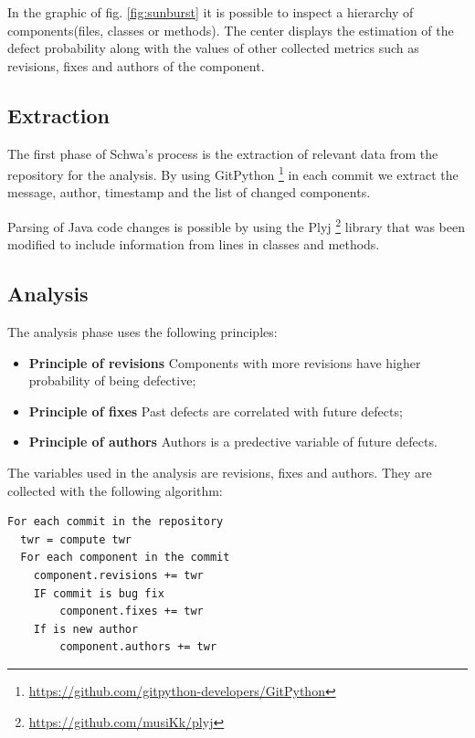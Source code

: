 \documentclass[9pt,a4paper]{extarticle}
\begin{document}
\begin{multicols}{2}
In the graphic of fig. \ref{fig:sunburst} it is possible to inspect a hierarchy
of components(files, classes or methods). The center displays the estimation of
the defect probability along with the values of other collected metrics such as
revisions, fixes and authors of the component.

\subsection{Extraction}
The first phase of Schwa's process is the extraction of relevant data from the
repository for the analysis. By using GitPython
\footnote{\url{https://github.com/gitpython-developers/GitPython}} in each
commit we extract the message, author, timestamp and the list of changed components.

Parsing of Java code changes is possible by using the Plyj
\footnote{\url{https://github.com/musiKk/plyj}} library that was been
modified to include information from lines in classes and methods.

\subsection{Analysis}
The analysis phase uses the following principles:

\begin{itemize}
\item \textbf{Principle of revisions} Components with more revisions have higher
probability of being defective\cite{859533};

\item \textbf{Principle of fixes} Past defects are correlated with future
defects\cite{Zimmermann:2007:PDE:1268984.1269057};

\item \textbf{Principle of authors} Authors is a predective variable of future
defects\cite{Moser:2008:CAE:1368088.1368114,D'Ambros:2012:EDP:2318097.2318149}.
\end{itemize}

The variables used in the analysis are revisions, fixes and authors. They are
collected with the following algorithm:

\begin{verbatim}
For each commit in the repository
  twr = compute twr
  For each component in the commit
    component.revisions += twr
    IF commit is bug fix
        component.fixes += twr
    If is new author
        component.authors += twr
\end{verbatim}


\end{multicols}
\end{document}
